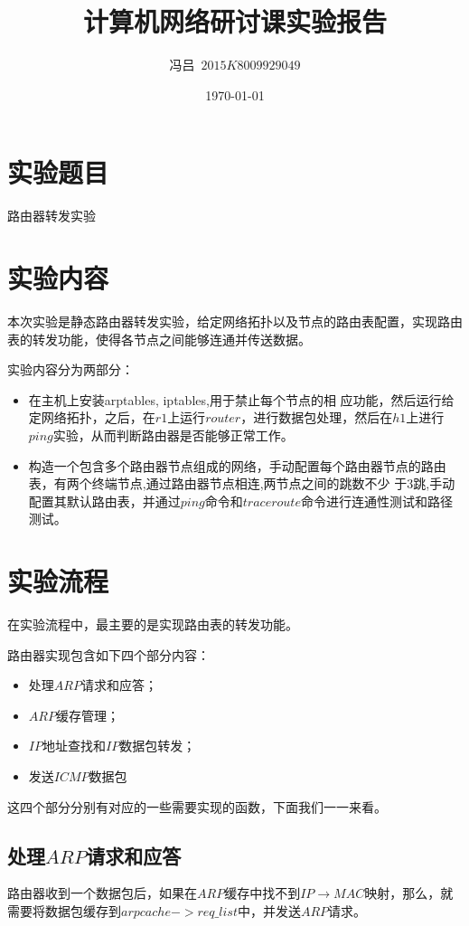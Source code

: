 \documentclass[UTF8,noindent]{ctexart}
\title{\CJKfamily{zhkai}计算机网络研讨课实验报告}
\author{{\CJKfamily{zhkai}冯吕}\ $2015K8009929049$}
\date{\today}
\begin{document}
\maketitle
{}
\section*{{实验题目}}路由器转发实验
\section*{{实验内容}}
本次实验是静态路由器转发实验，给定网络拓扑以及节点的路由表配置，实现路由表的转发功能，使得各节点之间能够连通并传送数据。

实验内容分为两部分：
\begin{itemize}
  \item 在主机上安装arptables, iptables,用于禁止每个节点的相
	应功能，然后运行给定网络拓扑，之后，在$r1$上运行$router$，进行数据包处理，然后在$h1$上进行$ping$实验，从而判断路由器是否能够正常工作。
  \item 构造一个包含多个路由器节点组成的网络，手动配置每个路由器节点的路由表，有两个终端节点,通过路由器节点相连,两节点之间的跳数不少
	于$3$跳,手动配置其默认路由表，并通过$ping$命令和$traceroute$命令进行连通性测试和路径测试。
\end{itemize}
\section*{{实验流程}}
在实验流程中，最主要的是实现路由表的转发功能。

路由器实现包含如下四个部分内容：
\begin{itemize}
  \item 处理$ARP$请求和应答；
	\item $ARP$缓存管理；
	  \item $IP$地址查找和$IP$数据包转发；
		\item 发送$ICMP$数据包
\end{itemize}
这四个部分分别有对应的一些需要实现的函数，下面我们一一来看。

\subsection*{处理$ARP$请求和应答}
路由器收到一个数据包后，如果在$ARP$缓存中找不到$IP\rightarrow MAC$映射，那么，就需要将数据包缓存到$arpcache->req\_list$中，并发送$ARP$请求。
\end{document}
